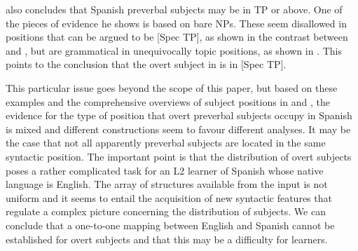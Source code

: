 \documentclass[output=paper]{langscibook}
\begin{document}
\ea%
    \label{ex:dominguez:6}
\z
\z

\citet{Villa-Garcia2018} also concludes that Spanish preverbal subjects may be in TP or above. One of the pieces of evidence he shows is based on bare NPs. These seem disallowed in positions that can be argued to be [Spec TP], as shown in the contrast between  and , but are grammatical in unequivocally topic positions, as shown in . This points to the conclusion that the overt subject in  is in [Spec TP].

\ea
\label{ex:dominguez:7}

\z
\z


This particular issue goes beyond the scope of this paper, but based on these examples and the comprehensive overviews of subject positions in \citet{Sheehan2016} and \citet{Villa-Garcia2018}, the evidence for the type of position that overt preverbal subjects occupy in Spanish is mixed and different constructions seem to favour different analyses. It may be the case that not all apparently preverbal subjects are located in the same syntactic position. The important point is that the distribution of overt subjects poses a rather complicated task for an L2 learner of Spanish whose native language is English. The array of structures available from the input is not uniform and it seems to entail the acquisition of new syntactic features that regulate a complex picture concerning the distribution of subjects. We can conclude that a one-to-one mapping between English and Spanish cannot be established for overt subjects and that this may be a difficulty for learners.
\end{document}
